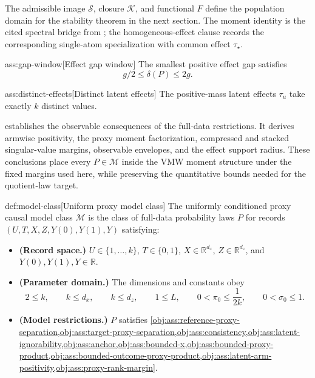 \documentclass[11pt]{article}
\begin{document}
The admissible image \(\mathscr S\), closure \(\mathcal K\), and functional \(F\) define the population domain for the stability theorem in the next section. The moment identity is the cited spectral bridge from \citet{VirkMazaheriWu2026}; the homogeneous-effect clause records the corresponding single-atom specialization with common effect \(\tau_\star\).

\begin{assumptionv}{ass:gap-window}[Effect gap window]
The smallest positive effect gap satisfies
\[
g/2\le \delta(P)\le 2g .
\]
\end{assumptionv}

\begin{assumptionv}{ass:distinct-effects}[Distinct latent effects]
The positive-mass latent effects \(\tau_u\) take exactly \(k\) distinct values.
\end{assumptionv}

 establishes the observable consequences of the full-data restrictions. It derives armwise positivity, the proxy moment factorization, compressed and stacked singular-value margins, observable envelopes, and the effect support radius. These conclusions place every \(P\in\mathcal M\) inside the VMW moment structure under the fixed margins used here, while preserving the quantitative bounds needed for the quotient-law target.



\begin{definitionv}{def:model-class}[Uniform proxy model class]
The uniformly conditioned proxy causal model class \(\mathcal M\) is the class of full-data probability laws \(P\) for records \((U,T,X,Z,Y(0),Y(1),Y)\) satisfying:
\begin{itemize}
\item \textbf{(Record space.)} \(U\in\{1,\ldots,k\}\), \(T\in\{0,1\}\), \(X\in\mathbb R^{d_x}\), \(Z\in\mathbb R^{d_z}\), and \(Y(0),Y(1),Y\in\mathbb R\).
\item \textbf{(Parameter domain.)} The dimensions and constants obey
\[
2\le k,\qquad k\le d_x,\qquad k\le d_z,\qquad 1\le L,\qquad 0<\pi_0\le \frac{1}{2k},\qquad 0<\sigma_0\le 1.
\]
\item \textbf{(Model restrictions.)} \(P\) satisfies \cref{obj:ass:reference-proxy-separation,obj:ass:target-proxy-separation,obj:ass:consistency,obj:ass:latent-ignorability,obj:ass:anchor,obj:ass:bounded-x,obj:ass:bounded-proxy-product,obj:ass:bounded-outcome-proxy-product,obj:ass:latent-arm-positivity,obj:ass:proxy-rank-margin}.
\end{itemize}
\end{definitionv}
\end{document}
